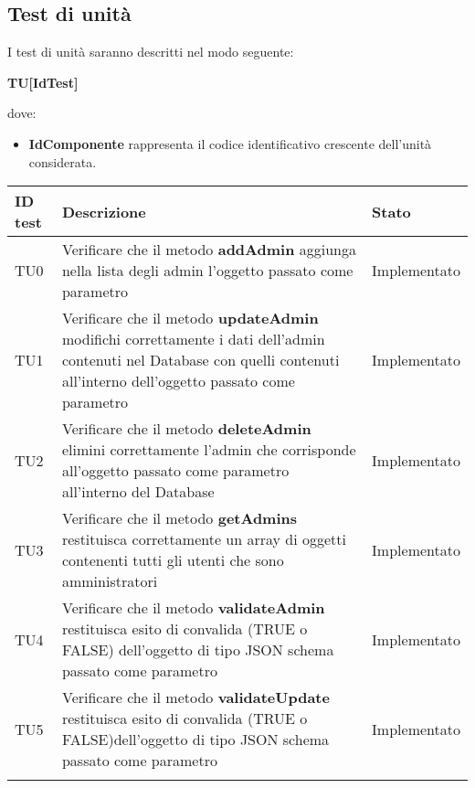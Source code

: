 \documentclass[../PianoDiQualifica_v3.0.0.tex]{subfiles}
\begin{document}
	\newpage
	\subsection{Test di unità}
	I test di unità saranno descritti nel modo seguente:
	\begin{center}
		\textbf{TU[IdTest]}
	\end{center}
	dove:
	\begin{itemize}
		\item \textbf{IdComponente} rappresenta il codice identificativo crescente dell'unità considerata.
	\end{itemize}

	\begin{longtable}[c] { >{\centering\arraybackslash}p{2cm} p{9cm} >{\centering\arraybackslash}p{4cm}}
		\toprule
		\centerline{\textbf{ID test}} & \centerline{\textbf{Descrizione}} & \centerline{\textbf{Stato}} \\
			\midrule
			TU0 & Verificare che il metodo \textbf{addAdmin} aggiunga nella lista degli admin l'oggetto passato come parametro & Implementato \\
			\addlinespace[0.3em]
			\midrule
			\addlinespace[0.3em]
			TU1 & Verificare che il metodo \textbf{updateAdmin} modifichi correttamente i dati dell'admin contenuti nel Database con quelli contenuti all'interno dell'oggetto passato come parametro & Implementato \\
			\addlinespace[0.3em]
			\midrule
			\addlinespace[0.3em]
			TU2 & Verificare che il metodo \textbf{deleteAdmin} elimini correttamente l'admin che corrisponde all'oggetto passato come parametro all'interno del Database & Implementato \\
			\addlinespace[0.3em]
			\midrule
			\addlinespace[0.3em]
			TU3 & Verificare che il metodo \textbf{getAdmins} restituisca correttamente un array di oggetti contenenti tutti gli utenti che sono amministratori & Implementato \\
			\addlinespace[0.3em]
			\midrule
			\addlinespace[0.3em]
			TU4 & Verificare che il metodo \textbf{validateAdmin} restituisca esito di convalida (TRUE o FALSE) dell'oggetto di tipo JSON schema passato come parametro & Implementato \\
			\addlinespace[0.3em]
			\midrule
			\addlinespace[0.3em]
			TU5 & Verificare che il metodo \textbf{validateUpdate} restituisca esito di convalida (TRUE o FALSE)dell'oggetto di tipo JSON schema passato come parametro & Implementato \\
			\addlinespace[0.3em]

\end{longtable}
\end{document}
